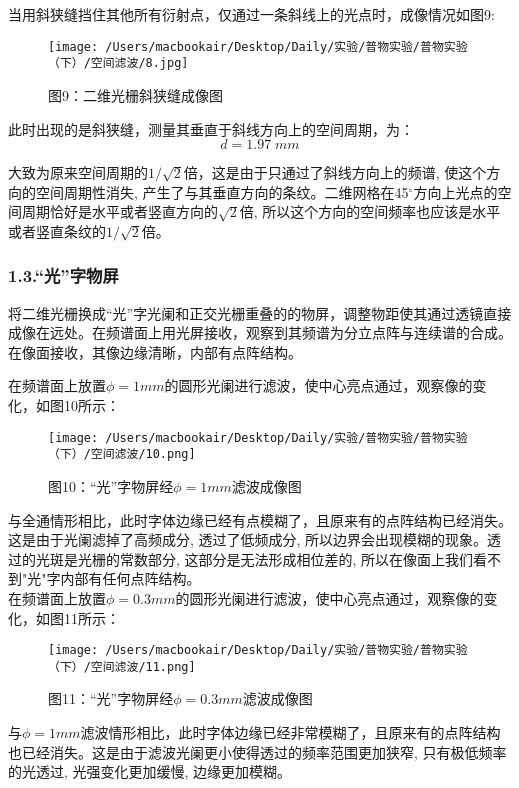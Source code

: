 \documentclass[23pt,a4paper,two column]{article}
\begin{document}
当用斜狭缝挡住其他所有衍射点，仅通过一条斜线上的光点时，成像情况如图9:
\begin{figure}[H]
\centering
\texttt{[image: /Users/macbookair/Desktop/Daily/实验/普物实验/普物实验（下）/空间滤波/8.jpg]}
\caption*{图9：二维光栅斜狭缝成像图}
\end{figure}

此时出现的是斜狭缝，测量其垂直于斜线方向上的空间周期，为：
\begin{equation*}
d=1.97\;mm
\end{equation*}

大致为原来空间周期的$1/\sqrt{2}$倍，这是由于只通过了斜线方向上的频谱, 使这个方向的空间周期性消失, 产生了与其垂直方向的条纹。二维网格在45$^\circ$方向上光点的空间周期恰好是水平或者竖直方向的$\sqrt{2}$倍, 所以这个方向的空间频率也应该是水平或者竖直条纹的$1/\sqrt{2}$倍。

\subsubsection*{1.3.“光”字物屏}

将二维光栅换成“光”字光阑和正交光栅重叠的的物屏，调整物距使其通过透镜直接成像在远处。在频谱面上用光屏接收，观察到其频谱为分立点阵与连续谱的合成。在像面接收，其像边缘清晰，内部有点阵结构。

\newpage

在频谱面上放置$\phi=1mm$的圆形光阑进行滤波，使中心亮点通过，观察像的变化，如图10所示：
\begin{figure}[H]
\centering
\texttt{[image: /Users/macbookair/Desktop/Daily/实验/普物实验/普物实验（下）/空间滤波/10.png]}
\caption*{图10：“光”字物屏经$\phi=1mm$滤波成像图}
\end{figure}

与全通情形相比，此时字体边缘已经有点模糊了，且原来有的点阵结构已经消失。这是由于光阑滤掉了高频成分, 透过了低频成分, 所以边界会出现模糊的现象。透过的光斑是光栅的常数部分, 这部分是无法形成相位差的, 所以在像面上我们看不到"光"字内部有任何点阵结构。\\

在频谱面上放置$\phi=0.3mm$的圆形光阑进行滤波，使中心亮点通过，观察像的变化，如图11所示：
\begin{figure}[H]
\centering
\texttt{[image: /Users/macbookair/Desktop/Daily/实验/普物实验/普物实验（下）/空间滤波/11.png]}
\caption*{图11：“光”字物屏经$\phi=0.3mm$滤波成像图}
\end{figure}

与$\phi=1mm$滤波情形相比，此时字体边缘已经非常模糊了，且原来有的点阵结构也已经消失。这是由于滤波光阑更小使得透过的频率范围更加狭窄, 只有极低频率的光透过, 光强变化更加缓慢, 边缘更加模糊。
\end{document}
